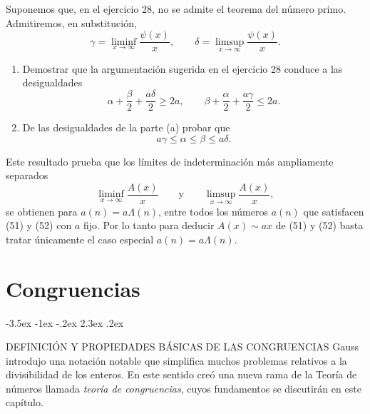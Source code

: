 \documentclass[12pt,a4paper]{book}
\makeatletter
\renewcommand\section{\@startsection{section}{1}{\z@}%
  {-3.5ex \@plus -1ex \@minus -.2ex}%
  {2.3ex \@plus .2ex}%
  {\normalfont\Large\bfseries\raggedright}}
\makeatother
\begin{document}
    \begin{ejercicio}
        Suponemos que, en el ejercicio 28, no se admite el teorema del número primo.
        Admitiremos, en substitución,
        \begin{equation*}
            \gamma=\liminf_{x\to\infty}\frac{\psi(x)}{x},\qquad\delta=\limsup_{x\to\infty}\frac{\psi(x)}{x}.
        \end{equation*}
        \begin{enumerate}
            \item[(a)] Demostrar que la argumentación sugerida en el ejercicio 28
            conduce a las desigualdades
            \begin{equation*}
                \alpha+\frac{\beta}{2}+\frac{a\delta}{2}\geq2a,\qquad
                \beta+\frac{\alpha}{2}+\frac{a\gamma}{2}\leq2a.
            \end{equation*}
            \item[(b)] De las desigualdades de la parte (a) probar que
            \begin{equation*}
                a\gamma\leq\alpha\leq\beta\leq a\delta.
            \end{equation*}
        \end{enumerate}
        Este resultado prueba que los límites de indeterminación más ampliamente
        separados
        \begin{equation*}
            \liminf_{x\to\infty}\frac{A(x)}{x}\qquad\text{y}\qquad\limsup_{x\to\infty}\frac{A(x)}{x},
        \end{equation*}
        se obtienen para $a(n)=a\Lambda(n)$, entre todos los números $a(n)$ que
        satisfacen (51) y (52) con $a$ fijo. Por lo tanto para deducir $A(x)\sim ax$
        de (51) y (52) basta tratar únicamente el caso especial $a(n)=a\Lambda(n)$.
    \end{ejercicio}

\chapter{Congruencias}

    \section{DEFINICIÓN Y PROPIEDADES BÁSICAS DE LAS CONGRUENCIAS}
    Gauss \cite{gauss1801} introdujo una notación notable que simplifica muchos problemas relativos a la
    divisibilidad de los enteros. En este sentido creó una nueva rama de la Teoría de
    números llamada \textit{teoría de congruencias}, cuyos fundamentos se discutirán en
    este capítulo.
\end{document}
